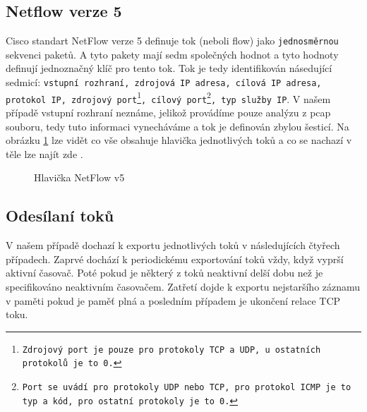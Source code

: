 \documentclass[12pt]{article}
\begin{document}
\subsection{Netflow verze 5}
Cisco standart NetFlow verze 5 definuje tok (neboli flow) jako \texttt{jednosměrnou} sekvenci paketů. A tyto pakety mají sedm společných hodnot a tyto
hodnoty definují jednoznačný klíč pro tento tok. Tok je tedy identifikován násedující sedmicí: \texttt{vstupní rozhraní, zdrojová IP adresa, cílová IP adresa, protokol IP, 
zdrojový port\footnote{Zdrojový port je pouze pro protokoly TCP a UDP, u ostatních protokolů je to 0.}, cílový port\footnote{Port se uvádí pro protokoly UDP nebo TCP, pro protokol ICMP je to typ a kód, pro ostatní protokoly je to 0.}, typ služby IP}.
V našem případě vstupní rozhraní neznáme, jelikož provádíme pouze analýzu z pcap souboru, tedy tuto informaci vynecháváme a tok je definován zbylou šesticí.
Na obrázku \ref{picture} lze vidět co vše obsahuje hlavička jednotlivých toků a co se nachazí v těle lze najít zde \cite{NTv5}.
\begin{figure}[H]
	\begin{center}
	\caption{Hlavička NetFlow v5}
	\label{picture}
	\end{center}
\end{figure}
\subsection{Odesílaní toků}
V našem případě dochazí k exportu jednotlivých toků v následujících čtyřech případech. Zaprvé dochází k periodickému exportování toků vždy, když vyprší aktivní časovač. Poté pokud je některý z toků neaktivní delší dobu
než je specifikováno neaktivním časovačem. Zatřetí dojde k exportu nejstaršího záznamu v paměti pokud je paměť plná a posledním případem je ukončení relace TCP toku.
\pagebreak
\end{document}
